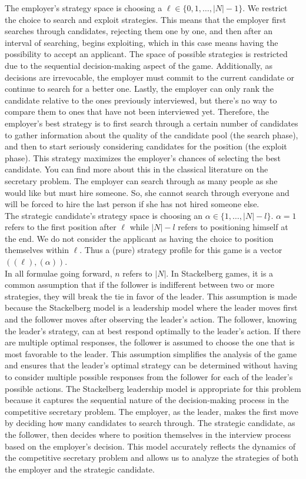 \documentclass{article}
\begin{document}
The employer's strategy space is choosing a $\ell\in\{0,1,\ldots, |N|-1\}$. We restrict the choice to search and exploit strategies. This means that the employer first searches through candidates, rejecting them one by one, and then after an interval of searching, begins exploiting, which in this case means having the possibility to accept an applicant. The space of possible strategies is restricted due to the sequential decision-making aspect of the game. Additionally, as decisions are irrevocable, the employer must commit to the current candidate or continue to search for a better one. Lastly, the employer can only rank the candidate relative to the ones previously interviewed, but there's no way to compare them to ones that have not been interviewed yet. Therefore, the employer's best strategy is to first search through a certain number of candidates to gather information about the quality of the candidate pool (the search phase), and then to start seriously considering candidates for the position (the exploit phase). This strategy maximizes the employer's chances of selecting the best candidate. You can find more about this in the classical literature on the secretary problem. The employer can search through as many people as she would like but must hire someone. So, she cannot search through everyone and will be forced to hire the last person if she has not hired someone else. \\
The strategic candidate's strategy space is choosing an $\alpha \in \{1,\ldots,|N|-l \} $. $\alpha = 1$ refers to the first position after $\ell$ while $|N|-l$ refers to positioning himself at the end. We do not consider the applicant as having the choice to position themselves within $\ell$. Thus a (pure) strategy profile for this game is a vector $((\ell),(\alpha))$.
\\[2ex]
In all formulae going forward, $n$ refers to $|N|$. In Stackelberg games, it is a common assumption that if the follower is indifferent between two or more strategies, they will break the tie in favor of the leader. This assumption is made because the Stackelberg model is a leadership model where the leader moves first and the follower moves after observing the leader's action. The follower, knowing the leader's strategy, can at best respond optimally to the leader's action. If there are multiple optimal responses, the follower is assumed to choose the one that is most favorable to the leader. This assumption simplifies the analysis of the game and ensures that the leader's optimal strategy can be determined without having to consider multiple possible responses from the follower for each of the leader's possible actions. The Stackelberg leadership model is appropriate for this problem because it captures the sequential nature of the decision-making process in the competitive secretary problem. The employer, as the leader, makes the first move by deciding how many candidates to search through. The strategic candidate, as the follower, then decides where to position themselves in the interview process based on the employer's decision. This model accurately reflects the dynamics of the competitive secretary problem and allows us to analyze the strategies of both the employer and the strategic candidate.
\end{document}
